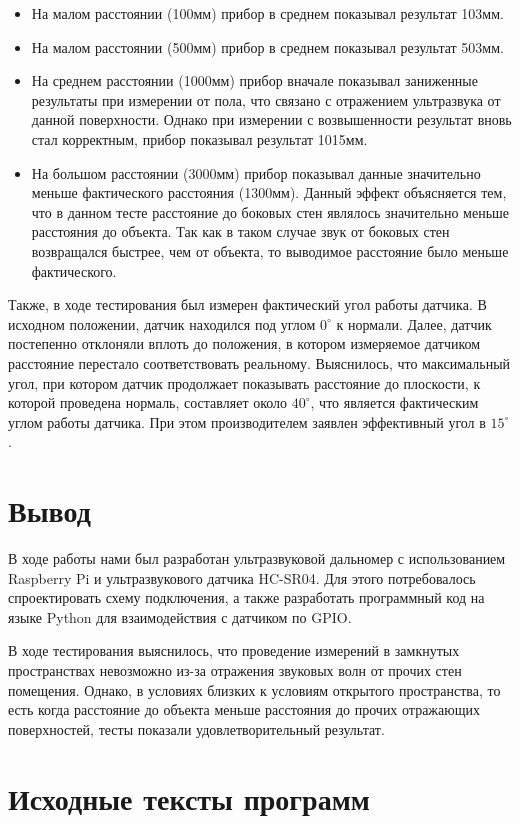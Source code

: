 \documentclass[a4paper, 14pt]{article}
\begin{document}
\begin{itemize}
	\item На малом расстоянии (100мм) прибор в среднем показывал результат 103мм.
	\item На малом расстоянии (500мм) прибор в среднем показывал результат 503мм.
	\item На среднем расстоянии (1000мм) прибор вначале показывал заниженные результаты при измерении от пола, что связано с отражением ультразвука от данной поверхности. Однако при измерении с возвышенности результат вновь стал корректным, прибор показывал результат 1015мм.
	\item На большом расстоянии (3000мм) прибор показывал данные значительно меньше фактического расстояния (1300мм). Данный эффект объясняется тем, что в данном тесте расстояние до боковых стен являлось значительно меньше расстояния до объекта. Так как в таком случае звук от боковых стен возвращался быстрее, чем от объекта, то выводимое расстояние было меньше фактического.
\end{itemize}

Также, в ходе тестирования был измерен фактический угол работы датчика. В исходном положении, датчик находился под углом $0^\circ$ к нормали. Далее, датчик постепенно отклоняли вплоть до положения, в котором измеряемое датчиком расстояние перестало соответствовать реальному.
Выяснилось, что максимальный угол, при котором датчик продолжает показывать расстояние до плоскости, к  которой проведена нормаль, составляет около $40^\circ$, что является фактическим углом работы датчика. При этом производителем заявлен эффективный угол в $15^\circ$.
\newpage
\section{Вывод}

В ходе работы нами был разработан ультразвуковой дальномер с использованием Raspberry Pi и ультразвукового датчика HC-SR04. Для этого потребовалось спроектировать схему подключения, а также разработать программный код на языке Python для взаимодействия с датчиком по GPIO.

В ходе тестирования выяснилось, что проведение измерений в замкнутых пространствах невозможно из-за отражения звуковых волн от прочих стен помещения. Однако, в условиях близких к условиям открытого пространства, то есть когда расстояние до объекта меньше расстояния до прочих отражающих поверхностей, тесты показали удовлетворительный результат.

\newpage
\section{Исходные тексты программ}
\end{document}
